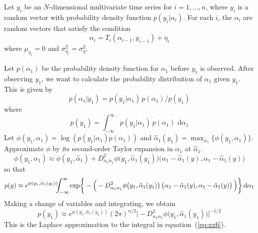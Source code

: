 %
%

Let $y_i$ be an $N$-dimensional multivariate time series for
$i=1,\ldots,n$, where $y_i$ is a random vector with probability
density function $p(y_i | \alpha_i)$.  For each $i$,
the $\alpha_i$ are random vectors that satisfy the condition
\begin{equation}
  \alpha_i=T_i(\alpha_{i-1},y_{i-1})+\eta_i
\end{equation}
where $\mu_{\eta_i}=0$ and $\sigma^2_{\eta_i}=\sigma^2_\eta$.

Let $p(\alpha_1)$ be the probability density function for 
$\alpha_1$ before $y_1$ is observed. After observing 
$y_1$, we want to calculate the probability distribution of $\alpha_1$
given $y_1$. This is given by
\begin{equation}
  p(\alpha_1 | y_1)=p(y_1|\alpha_1)\,p(\alpha_1)\big/p(y_1)
\end{equation}
where
\begin{equation}\label{eq:xx6}
  p(y_1)=\int_{-\infty}^\infty p(y_1|\alpha_1)\, p(\alpha_1) \,\,\textrm{d}\alpha_1
\end{equation}
Let $\phi(y_1,\alpha_1)=\log(p(y_1|\alpha_1)p(\alpha_1))$ and
$\hat\alpha_1(y_1)=\max_{\alpha_1} \{\phi(y_1,\alpha_1)\}$.
Approximate $\phi$ by its second-order Taylor expansion in
$\alpha_1$ at $\hat\alpha_1$.
\begin{equation}
  \phi(y_1,\alpha_1)\approx \phi(y_1,\hat\alpha_1) 
  + D^2_{\alpha_1\alpha_1}\phi \big(y_1,\hat\alpha_1(y_1)\big) \big(\alpha_1-\hat\alpha_1(y),
  \alpha_1-\hat\alpha_1(y) \big)
\end{equation}
so that 
\begin{equation}\label{eq:xx5}
  p(y)\approx e^{\phi(y_1,\hat\alpha_1(y_1))} \kern-.5em 
  \int_{-\infty}^\infty \kern-.25em \exp\bigg\{- 
  \Big(-D^2_{\alpha_1\alpha_1}\phi 
      \big(y_1,\hat\alpha_1(y_1) \big)\,
      \big (\alpha_1-\hat\alpha_1(y),  \alpha_1-\hat\alpha_1(y) \big) \,
   \Big) \bigg\}\,\textrm{d}\alpha_1
\end{equation}
Making a change of variables and integrating, we obtain
\begin{equation}\label{eq:xx4}
  p(y_1)\approx e^{\phi (y_1,\hat\alpha_1(y_1) )}  (2\pi)^{n/2} 
  \Big | -D^2_{\alpha_1\alpha_1} \phi \big(y_1,\hat\alpha_1(y_1) \big) \Big |^{-1/2}
\end{equation}
This is the Laplace approximation to the integral in equation~(\ref{eq:xx6}).

